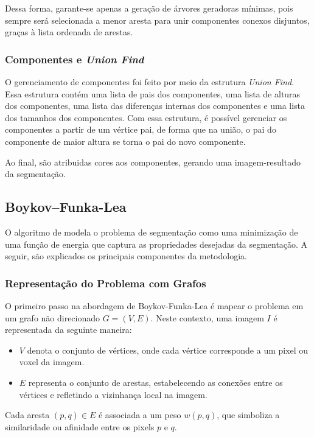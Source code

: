 \documentclass[12pt]{article}
\begin{document}
Dessa forma, garante-se apenas a geração de árvores geradoras mínimas, pois sempre será selecionada a menor aresta para unir componentes conexos disjuntos, graças à lista ordenada de arestas.

\subsubsection{Componentes e \textit{Union Find}}
O gerenciamento de componentes foi feito por meio da estrutura \textit{Union Find}. Essa estrutura contém uma lista de pais dos componentes, uma lista de alturas dos componentes, uma lista das diferenças internas dos componentes e uma lista dos tamanhos dos componentes. Com essa estrutura, é possível gerenciar os componentes a partir de um vértice pai, de forma que na união, o pai do componente de maior altura se torna o pai do novo componente.

Ao final, são atribuidas cores aos componentes, gerando uma imagem-resultado da segmentação.

\subsection{Boykov--Funka-Lea} \label{subsec:abfl}
O algoritmo de \cite{boykov:06} modela o problema de segmentação como uma minimização de uma função de energia que captura as propriedades desejadas da segmentação. A seguir, são explicados os principais componentes da metodologia.

\subsubsection{Representação do Problema com Grafos}

O primeiro passo na abordagem de Boykov-Funka-Lea é mapear o problema em um grafo não direcionado $G = (V, E)$. Neste contexto, uma imagem $I$ é representada da seguinte maneira:

\begin{itemize} \item $V$ denota o conjunto de vértices, onde cada vértice corresponde a um pixel ou voxel da imagem. \item $E$ representa o conjunto de arestas, estabelecendo as conexões entre os vértices e refletindo a vizinhança local na imagem. \end{itemize}

Cada aresta $(p, q) \in E$ é associada a um peso $w(p, q)$, que simboliza a similaridade ou afinidade entre os pixels $p$ e $q$.
\end{document}
